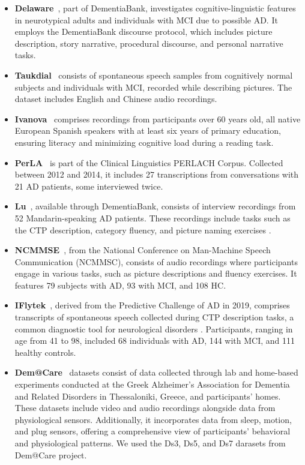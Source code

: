 \begin{itemize}
    \item \textbf{Delaware}~\cite{lanzi2023dementiabank}, part of DementiaBank, investigates cognitive-linguistic features in neurotypical adults and individuals with MCI due to possible AD. It employs the DementiaBank discourse protocol, which includes picture description, story narrative, procedural discourse, and personal narrative tasks. 
    \item \textbf{Taukdial}~\cite{luz2024connected} consists of spontaneous speech samples from cognitively normal subjects and individuals with MCI, recorded while describing pictures. The dataset includes English and Chinese audio recordings.
    \item \textbf{Ivanova}~\cite{ivanova2022discriminating} comprises recordings from participants over 60 years old, all native European Spanish speakers with at least six years of primary education, ensuring literacy and minimizing cognitive load during a reading task. 
    \item \textbf{PerLA}~\cite{suarez2024alzheimer} is part of the Clinical Linguistics PERLACH Corpus. %
    Collected between 2012 and 2014, it includes 27 transcriptions from conversations with 21 AD patients, some interviewed twice.
    \item \textbf{Lu}~\cite{macwhinney2011aphasiabank}, available through DementiaBank, consists of interview recordings from 52 Mandarin-speaking AD patients. These recordings include tasks such as the CTP description, category fluency, and picture naming exercises \cite{qi2023noninvasive}.
    \item \textbf{NCMMSE}~\cite{ortiz2024deep}, from the National Conference on Man-Machine Speech Communication (NCMMSC), consists of audio recordings where participants engage in various tasks, such as picture descriptions and fluency exercises. It features 79 subjects with AD, 93 with MCI, and 108 HC. %
    \item \textbf{IFlytek}~\cite{liu2021spontaneous}, derived from the Predictive Challenge of AD in 2019, comprises transcripts of spontaneous speech collected during CTP description tasks, a common diagnostic tool for neurological disorders \cite{liu2021spontaneous}. Participants, ranging in age from 41 to 98, included 68 individuals with AD, 144 with MCI, and 111 healthy controls.
    \item \textbf{Dem@Care}~\cite{karakostas2016care} datasets consist of data collected through lab and home-based experiments conducted at the Greek Alzheimer’s Association for Dementia and Related Disorders in Thessaloniki, Greece, and participants' homes. These datasets include video and audio recordings alongside data from physiological sensors. Additionally, it incorporates data from sleep, motion, and plug sensors, offering a comprehensive view of participants' behavioral and physiological patterns. We used the Ds3, Ds5, and Ds7 darasets from Dem@Care project.

\end{itemize}
